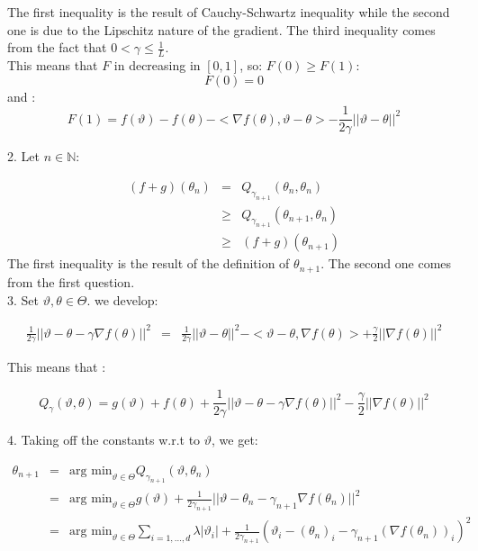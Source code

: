The first inequality is the result of Cauchy-Schwartz inequality while the second one is due to the Lipschitz nature of the gradient. The third inequality comes from the fact that $0<\gamma\leq \frac{1}{L}$.\\
This means that $F$ in decreasing in $[0,1]$, so: $F(0)\geq F(1)$:
$$F(0)=0$$
and :
$$F(1)=f(\vartheta)- f(\theta)-<\nabla f(\theta),\vartheta-\theta>-\frac{1}{2\gamma}\vert\vert \vartheta-\theta\vert\vert^2$$

2. Let $n \in \mathbb{N}$:

\begin{eqnarray*}
	(f+g)(\theta_{n})&=& Q_{\gamma_{n+1}}(\theta_{n},\theta_{n})\\
							&\geq& Q_{\gamma_{n+1}}(\theta_{n+1},\theta_{n})\\ 
							&\geq& (f+g)(\theta_{n+1})
\end{eqnarray*}
The first inequality is the result of the definition of $\theta_{n+1}$. The second one comes from the first question.\\

3. Set $ \vartheta , \theta \in \Theta$. we develop: 

\begin{eqnarray*}
	\frac{1}{2\gamma}\vert\vert \vartheta - \theta -\gamma \nabla f(\theta) \vert\vert^2&=&\frac{1}{2\gamma}\vert\vert \vartheta - \theta \vert \vert ^2 - <\vartheta - \theta ,\nabla f(\theta)>+\frac{\gamma}{2} \vert\vert \nabla f(\theta)\vert\vert^2
\end{eqnarray*}

This means that :

$$Q_{\gamma}(\vartheta,\theta)= g(\vartheta)+f(\theta)+ 	\frac{1}{2\gamma}\vert\vert \vartheta - \theta -\gamma \nabla f(\theta) \vert\vert^2-\frac{\gamma}{2} \vert\vert \nabla f(\theta)\vert\vert^2$$

4. Taking off the constants w.r.t to $\vartheta$, we get:

\begin{eqnarray*}
	\theta_{n+1}&=& \text{arg min}_{\vartheta \in \Theta} Q_{\gamma_{n+1}} (\vartheta,\theta_n)\\
						&=& \text{arg min}_{\vartheta \in \Theta} g(\vartheta)+\frac{1}{2\gamma_{n+1}}\vert\vert \vartheta - \theta_n -\gamma_{n+1} \nabla f(\theta_n) \vert\vert^2\\
						&=& \text{arg min}_{\vartheta \in \Theta} \sum_{i=1,\dots,d} \lambda \vert \vartheta_i \vert 
					 + \frac{1}{2\gamma_{n+1}}( \vartheta_i -( \theta_n)_i - \gamma_{n+1}( \nabla f(\theta_n))_i )^2
\end{eqnarray*}

